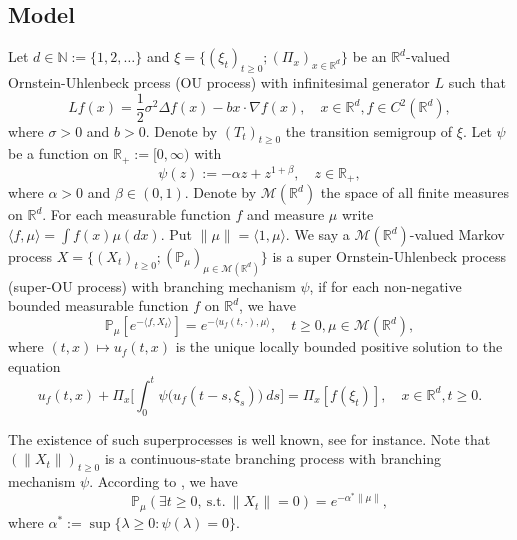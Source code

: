 \documentclass[12pt,oneside,english]{amsart}
\theoremstyle{plain}
\theoremstyle{definition}
\numberwithin{equation}{section}
\begin{document}
\subsection{Model}
    Let $d \in \mathbb N:= \{1,2,\dots\}$ and
    $\xi=\{(\xi_t)_{t\geq 0}; (\Pi_x)_{x\in \mathbb R^d}\}$ be an $\mathbb R^d$-valued Ornstein-Uhlenbeck prcess (OU process) with infinitesimal generator $L$ such that
\begin{equation}
\label{eq: OU generator}
    Lf(x)
        = \frac{1}{2}\sigma^2\Delta f(x)-b x \cdot \nabla f(x),
        \quad  x\in \mathbb R^d,
        f \in C^2(\mathbb{R}^d),
\end{equation}
    where $\sigma>0$ and $b>0$.
    Denote by $(T_t)_{t\geq 0}$ the transition semigroup of $\xi$.
    Let $\psi$ be a function on $\mathbb R_+:= [0,\infty)$ with
\begin{equation}\label{mechanism}
    \psi(z)
        := - \alpha z + z^{1+\beta},
        \quad z \in \mathbb R_+,
\end{equation}
        where $\alpha > 0$ and $\beta \in (0,1) $.
    Denote by $\mathcal{M}(\mathbb{R}^d)$ the space of all finite measures on $\mathbb{R}^d$.
    For each measurable function $f$ and measure $\mu$ write $\langle f,\mu\rangle = \int f(x)\mu(dx)$.
    Put $\|\mu\|=\langle 1,\mu\rangle$.
    We say a $\mathcal{M}(\mathbb{R}^d)$-valued Markov process $X = \{(X_t)_{t\geq 0}; (\mathbb{P}_{\mu})_{\mu \in \mathcal M(\mathbb R^d)}\}$ is a super Ornstein-Uhlenbeck process (super-OU process) with branching mechanism $\psi$, if for each non-negative bounded measurable function $f$ on $\mathbb{R}^d$, we have
\begin{equation} \label{super}
    \mathbb{P}_{\mu}[e^{-\langle f,X_t \rangle}]
        = e^{-\langle u_f(t,\cdot), \mu \rangle},
        \quad t\geq 0, \mu \in \mathcal M(\mathbb R^d),
\end{equation}
        where $(t,x) \mapsto u_f(t,x)$ is the unique locally bounded positive solution to the equation
\begin{equation}\label{eq1}
        u_f(t,x) + \Pi_x \Big[ \int_0^t\psi\big(u_f(t-s, \xi_s)\big)~ds\Big]
        = \Pi_x [f(\xi_t)],
        \quad x\in \mathbb R^d, t\geq 0.
\end{equation}

    The existence of such superprocesses is well known, see \cite{EB} for instance.
    Note that $(\|X_t\|)_{t\geq 0}$ is a continuous-state branching process with branching mechanism $\psi$.
    According to \cite[Theorem 12.5 \& Theorem 12.7]{Kyprianou2014Fluctuations}, we have
\begin{equation}
    \mathbb{P}_{\mu} (\exists t\geq 0,~\text{s.t.}~\|X_t\|=0)
    = e^{-\alpha^* \|\mu\|},
\end{equation}
    where $\alpha^* := \sup\{\lambda \geq 0: \psi(\lambda) = 0\}$.
    
\end{document}
